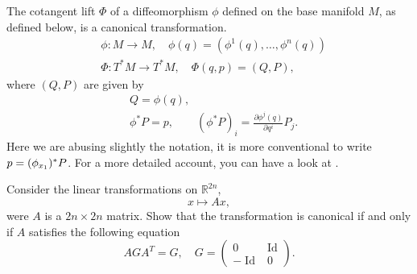\documentclass[english,fontsize=11pt,paper=a5,oneside]{scrbook}
\newcommand{\R}{\mathbb{R}}
\let\d\relax
\DeclareMathOperator{\d}{d}
\DeclareMathOperator{\Id}{Id}
\theoremstyle{definition}
\newenvironment{example}
  {\pushQED{\qed}\renewcommand{\qedsymbol}{$\lozenge$}\examplex}
  {\popQED\endexamplex}
\newenvironment{exercise}
  {\pushQED{\qed}\renewcommand{\qedsymbol}{$\maltese$}\exercisex}
  {\popQED\endexercisex}
\begin{document}
\begin{example}\label{ex:hamlift1}
    The cotangent lift $\Phi$ of a diffeomorphism $\phi$ defined on the base manifold $M$, as defined below, is a canonical transformation.
    \begin{align}
        &\phi:M\to M, \quad \phi(q) = \left(\phi^1(q), \ldots, \phi^n(q)\right)\\
        &\Phi:T^*M\to T^*M, \quad \Phi(q,p) = (Q, P),
    \end{align}
    where $(Q,P)$ are given by
    \begin{align}
        &Q = \phi(q),\\ 
        &\phi^* P = p, \qquad (\phi^* P)_i = \frac{\partial \phi^j(q)}{\partial q^i} P_j.
    \end{align}
    Here we are abusing slightly the notation, it is more conventional to write $p = (\d\phi_{x_1})^* P$.
    For a more detailed account, you can have a look at \cite[Chapter 6.3 and in particular formula (6.3.4)]{book:marsdenratiu}.
\end{example}

\begin{exercise}
    Consider the linear transformations on $\R^{2n}$,
    \begin{equation}
        x \mapsto A x,
    \end{equation}
    were $A$ is a $2n\times2n$ matrix.
    Show that the transformation is canonical if and only if $A$ satisfies the following equation
    \begin{equation}
        A G A^T = G, \quad G=\begin{pmatrix}
            0&\Id\\-\Id&0
        \end{pmatrix}.
    \end{equation}
\end{exercise}
\end{document}
